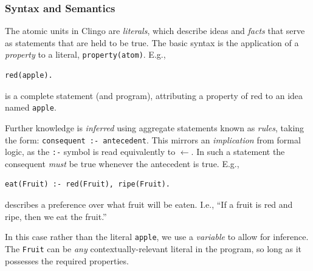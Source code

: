 \subsubsection{Syntax and Semantics}

The atomic units in Clingo are \emph{literals}, which describe ideas and \emph{facts} that serve as statements that are held to be true. The basic syntax is the application of a \emph{property} to a literal, {\tt property(atom)}. E.g.,
\begin{lstlisting}[basicstyle=\ttfamily\small]
red(apple).
\end{lstlisting}
is a complete statement (and program), attributing a property of {red} to an idea named {\tt apple}. 

Further knowledge is \emph{inferred} using aggregate statements known as \emph{rules}, taking the form: {\tt consequent :- antecedent}. This mirrors an \emph{implication} from formal logic, as the {\tt :-} symbol is read equivalently to $\leftarrow$. In such a statement the consequent \emph{must} be true whenever the antecedent is true. E.g.,
\begin{lstlisting}[basicstyle=\ttfamily\small]
eat(Fruit) :- red(Fruit), ripe(Fruit).
\end{lstlisting}
describes a preference over what fruit will be eaten. I.e., ``If a fruit is red and ripe, then we eat the fruit.''

In this case rather than the literal {\tt apple}, we use a \emph{variable} to allow for inference. The {\tt Fruit} can be \emph{any} contextually-relevant literal in the program, so long as it possesses the required properties.
